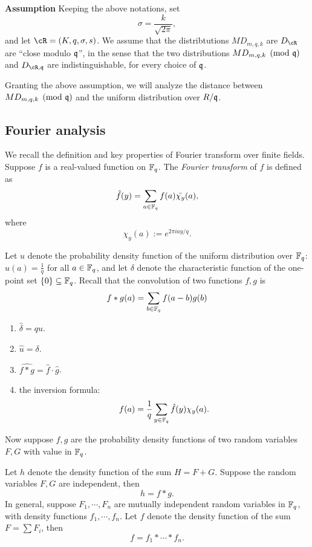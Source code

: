 \documentclass{amsart}
\begin{document}
{\bf Assumption} Keeping the above notations, set
$$
    \sigma = \frac{k}{\sqrt{2 \pi}},
$$ and
let $\cR = (K, q, \sigma, s)$. We assume that the distribtutions $MD_{m,q,k}$ are $D_\cR$ are ``close modulo $\mathfrak{q}$'', in the sense that the two distributions $MD_{m,q,k} \pmod{\mathfrak{q}}$ and
$D_{\cR,\fq}$ are indistinguishable, for every choice of $\mathfrak{q}$.

Granting the above assumption, we will analyze the distance between $MD_{m,q,k} \pmod{\mathfrak{q}}$ and the uniform distribution over $R/\mathfrak{q}$.

\subsection{Fourier analysis}
We recall the definition and key properties of Fourier transform over finite fields.
Suppose $f$ is a real-valued function on $\mathbb{F}_q$. The {\it Fourier transform} of $f$ is defined as
\[
    \hat{f}(y) = \sum_{a \in \mathbb{F}_q} f(a) \bar{\chi_y}(a),
\]
where $$\chi_y(a) := e^{2 \pi i ay/q}.$$

Let $u$ denote the probability density function of the uniform distribution over $\mathbb{F}_q$: $u(a) = \frac{1}{q}$ for all $a \in \mathbb{F}_q$, and let $\delta$ denote the characteristic function of the
one-point set $\{0\} \subseteq \mathbb{F}_q$. Recall that the convolution of two functions $f,g$ is
\[
    f  \ast g  (a) = \sum_{b \in \mathbb{F}_q} f(a-b)g(b)
\]
\begin{Prop} \qquad
\begin{enumerate}
\item $\hat{\delta} = qu$.

\item  $\hat{u} = \delta$.

\item $\widehat{f \ast g} = \hat{f} \cdot \hat{g}$.


\item the inversion formula:
\[
    f(a) = \frac{1}{q} \sum_{y \in \mathbb{F}_q} \hat{f}(y)\chi_y(a).
\]

\end{enumerate}
\end{Prop}

Now suppose $f,g$ are the probability density functions of two random variables $F,G$ with value in $\mathbb{F}_q$.

\begin{Lemma}
Let $h$ denote the density function of the sum $H =F+G$. Suppose the random variables $F,G$ are independent, then
\[
    h =  f \ast g.
\]
In general, suppose $F_1, \cdots, F_n$ are mutually independent random variables in $\mathbb{F}_q$, with density functions $f_1, \cdots, f_n$. Let $f$ denote the density function of the sum $F = \sum F_i$, then
\[
    f = f_1 \ast \cdots \ast f_n.
\]
\end{Lemma}
\end{document}

